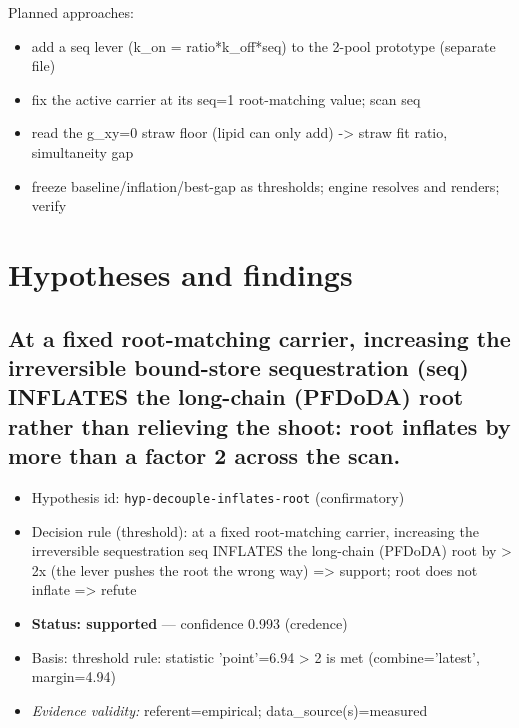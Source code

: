 \documentclass{article}
\begin{document}
Planned approaches:
\begin{itemize}
  \item add a seq lever (k\_on = ratio*k\_off*seq) to the 2-pool prototype (separate file)
  \item fix the active carrier at its seq=1 root-matching value; scan seq
  \item read the g\_xy=0 straw floor (lipid can only add) -> straw fit ratio, simultaneity gap
  \item freeze baseline/inflation/best-gap as thresholds; engine resolves and renders; verify
\end{itemize}

\section{Hypotheses and findings}

\subsection{At a fixed root-matching carrier, increasing the irreversible bound-store sequestration (seq) INFLATES the long-chain (PFDoDA) root rather than relieving the shoot: root inflates by more than a factor 2 across the scan.}
\begin{itemize}
  \item Hypothesis id: \texttt{hyp-decouple-inflates-root} (confirmatory)
  \item Decision rule (threshold): at a fixed root-matching carrier, increasing the irreversible sequestration seq INFLATES the long-chain (PFDoDA) root by > 2x (the lever pushes the root the wrong way) => support; root does not inflate => refute
  \item \textbf{Status: supported} --- confidence 0.993 (credence)
  \item Basis: threshold rule: statistic 'point'=6.94 > 2 is met (combine='latest', margin=4.94)
  \item \textit{Evidence validity:} referent=empirical; data\_source(s)=measured
\end{itemize}
\end{document}
